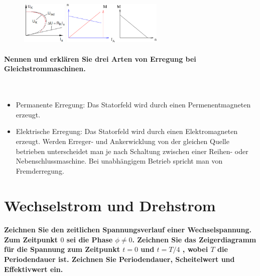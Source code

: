 \documentclass[a4paper, 11pt, parskip=half]{scrartcl}
\begin{document}
\begin{figure}[H]
    \centering
    \begin{minipage}[b]{0.3\textwidth}
        \centering
        \includegraphics[height=2cm]{image/8/4.3}
    \end{minipage}
    \hspace{2cm}
    \begin{minipage}[b]{0.3\textwidth}
        \centering
        \includegraphics[height=2cm]{image/8/4.4}
    \end{minipage}
\end{figure}

\paragraph{Nennen und erklären Sie drei Arten von Erregung bei Gleichstrommaschinen.} ~

\begin{itemize}
    \item Permanente Erregung: Das Statorfeld wird durch einen Permenentmagneten erzeugt.
    
    \item Elektrische Erregung: Das Statorfeld wird durch einen Elektromagneten erzeugt. Werden
        Erreger- und Ankerwicklung von der gleichen Quelle betrieben unterscheidet man je nach
        Schaltung zwischen einer Reihen- oder Nebenschlussmaschine. Bei unabhängigem Betrieb spricht
        man von Fremderregung.
\end{itemize}

\newpage

\section{Wechselstrom und Drehstrom}

\paragraph{Zeichnen Sie den zeitlichen Spannungsverlauf einer Wechselspannung. Zum Zeitpunkt $0$ sei
die Phase $\phi \neq 0$. Zeichnen Sie das Zeigerdiagramm für die Spannung zum Zeitpunkt $t=0$ und
$t=T/4$ , wobei $T$ die Periodendauer ist. Zeichnen Sie Periodendauer, Scheitelwert und Effektivwert
ein.}
\end{document}
